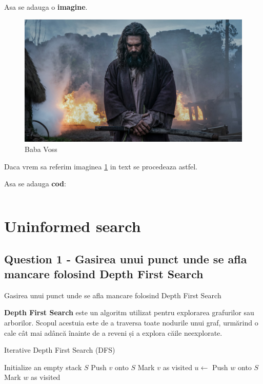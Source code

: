 \par Asa se adauga o \textbf{imagine}.
\begin{figure}[H]
    \centering  %
    \includegraphics[scale=0.35]{resources/see_image.jpg}  %
    \caption{Baba Voss}  %
    \label{fig:figura1} %
\end{figure}
Daca vrem sa referim imaginea \ref{fig:figura1} in text se procedeaza astfel.

\par Asa se adauga \textbf{cod}:
\inputminted[linenos]{python}{code/fibo.py}


\section{Uninformed search}
\subsection{Question 1 - Gasirea unui punct unde se afla mancare folosind Depth First Search}
\par Gasirea unui punct unde se afla mancare folosind Depth First Search
\par \textbf{Depth First Search} este un algoritm utilizat pentru explorarea grafurilor sau arborilor. Scopul acestuia este de a traversa toate nodurile unui graf, urmărind o cale cât mai adâncă înainte de a reveni și a explora căile neexplorate.
\begin{algorithm}
\caption{Iterative Depth First Search (DFS)}
\begin{algorithmic}[1]
    \State Initialize an empty stack $S$
    \State Push $v$ onto $S$
    \State Mark $v$ as visited
        \State $u \gets$ 
                \State Push $w$ onto $S$
                \State Mark $w$ as visited
            \EndIf
        \EndFor
    \EndWhile
\EndProcedure
\end{algorithmic}
\end{algorithm}

